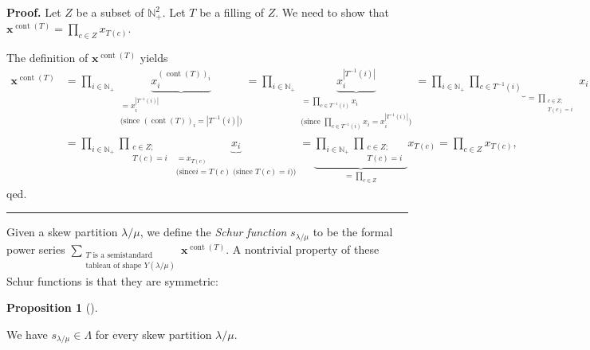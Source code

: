 \documentclass[numbers=enddot,12pt,final,onecolumn,notitlepage]{scrartcl}%
\theoremstyle{definition}
\newtheorem{prop}[theo]{Proposition}
\newenvironment{proposition}[1][]
{\begin{prop}[#1]\begin{leftbar}}
{\end{leftbar}\end{prop}}
\newenvironment{proof}[1][Proof]{\noindent\textbf{#1.} }{\ \rule{0.5em}{0.5em}}
\newenvironment{verlong}{}{}
\let\sumnonlimits\sum
\let\prodnonlimits\prod
\renewcommand{\sum}{\sumnonlimits\limits}
\renewcommand{\prod}{\prodnonlimits\limits}
\begin{document}
\begin{verlong}
\begin{proof}
Let $Z$ be a subset of $\mathbb{N}_{+}^{2}$. Let $T$ be a filling of $Z$. We
need to show that $\mathbf{x}^{\operatorname*{cont}\left(  T\right)  }%
=\prod_{c\in Z}x_{T\left(  c\right)  }$.

The definition of $\mathbf{x}^{\operatorname*{cont}\left(  T\right)  }$ yields%
\begin{align*}
\mathbf{x}^{\operatorname*{cont}\left(  T\right)  }  &  =\prod_{i\in
\mathbb{N}_{+}}\underbrace{x_{i}^{\left(  \operatorname*{cont}\left(
T\right)  \right)  _{i}}}_{\substack{=x_{i}^{\left\vert T^{-1}\left(
i\right)  \right\vert }\\\text{(since }\left(  \operatorname*{cont}\left(
T\right)  \right)  _{i}=\left\vert T^{-1}\left(  i\right)  \right\vert
\text{)}}}=\prod_{i\in\mathbb{N}_{+}}\underbrace{x_{i}^{\left\vert
T^{-1}\left(  i\right)  \right\vert }}_{\substack{=\prod_{c\in T^{-1}\left(
i\right)  }x_{i}\\\text{(since }\prod_{c\in T^{-1}\left(  i\right)  }%
x_{i}=x_{i}^{\left\vert T^{-1}\left(  i\right)  \right\vert }\text{)}}%
}=\prod_{i\in\mathbb{N}_{+}}\underbrace{\prod_{c\in T^{-1}\left(  i\right)  }%
}_{=\prod_{\substack{c\in Z;\\T\left(  c\right)  =i}}}x_{i}\\
&  =\prod_{i\in\mathbb{N}_{+}}\prod_{\substack{c\in Z;\\T\left(  c\right)
=i}}\underbrace{x_{i}}_{\substack{=x_{T\left(  c\right)  }\\\text{(since
}i=T\left(  c\right)  \text{ (since }T\left(  c\right)  =i\text{))}%
}}=\underbrace{\prod_{i\in\mathbb{N}_{+}}\prod_{\substack{c\in Z;\\T\left(
c\right)  =i}}}_{=\prod_{c\in Z}}x_{T\left(  c\right)  }=\prod_{c\in
Z}x_{T\left(  c\right)  },
\end{align*}
qed.
\end{proof}
\end{verlong}

Given a skew partition $\lambda/\mu$, we define the \textit{Schur function}
$s_{\lambda/\mu}$ to be the formal power series $\sum_{\substack{T\text{ is a
semistandard}\\\text{tableau of shape }Y\left(  \lambda/\mu\right)
}}\mathbf{x}^{\operatorname*{cont}\left(  T\right)  }$. A nontrivial property
of these Schur functions is that they are symmetric:

\begin{proposition}
\label{prop.schur.symm}We have $s_{\lambda/\mu}\in\Lambda$ for every skew
partition $\lambda/\mu$.
\end{proposition}
\end{document}
